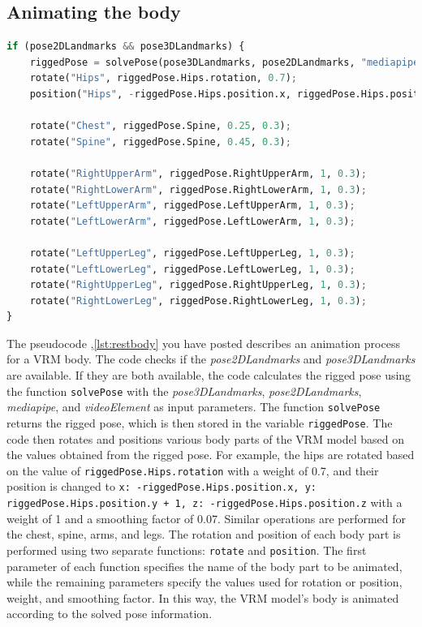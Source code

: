 \subsection{Animating the body}
\begin{lstlisting}[language=Python,caption=Animating the rest of the body,label=lst:restbody]
    if (pose2DLandmarks && pose3DLandmarks) {
    riggedPose = solvePose(pose3DLandmarks, pose2DLandmarks, "mediapipe", videoElement);
    rotate("Hips", riggedPose.Hips.rotation, 0.7);
    position("Hips", -riggedPose.Hips.position.x, riggedPose.Hips.position.y + 1, -riggedPose.Hips.position.z, 1, 0.07);

    rotate("Chest", riggedPose.Spine, 0.25, 0.3);
    rotate("Spine", riggedPose.Spine, 0.45, 0.3);

    rotate("RightUpperArm", riggedPose.RightUpperArm, 1, 0.3);
    rotate("RightLowerArm", riggedPose.RightLowerArm, 1, 0.3);
    rotate("LeftUpperArm", riggedPose.LeftUpperArm, 1, 0.3);
    rotate("LeftLowerArm", riggedPose.LeftLowerArm, 1, 0.3);

    rotate("LeftUpperLeg", riggedPose.LeftUpperLeg, 1, 0.3);
    rotate("LeftLowerLeg", riggedPose.LeftLowerLeg, 1, 0.3);
    rotate("RightUpperLeg", riggedPose.RightUpperLeg, 1, 0.3);
    rotate("RightLowerLeg", riggedPose.RightLowerLeg, 1, 0.3);
}

\end{lstlisting}
The pseudocode ,\ref{lst:restbody} you have posted describes an animation process for a VRM body. 
The code checks if the \emph{pose2DLandmarks} and \emph{pose3DLandmarks} are available. If they are both available, 
the code calculates the rigged pose using the function \texttt{solvePose} with the \emph{pose3DLandmarks}, \emph{pose2DLandmarks}, 
\emph{mediapipe}, and \emph{videoElement} as input parameters. The function \texttt{solvePose} returns the rigged pose, which 
is then stored in the variable \texttt{riggedPose}.
The code then rotates and positions various body parts of the VRM model based on the values obtained from the 
rigged pose. For example, the hips are rotated based on the value of \texttt{riggedPose.Hips.rotation} with a weight 
of 0.7, and their position is changed to \texttt{x: -riggedPose.Hips.position.x, y: riggedPose.Hips.position.y + 1, z: 
-riggedPose.Hips.position.z} with a weight of 1 and a smoothing factor of 0.07. Similar operations are performed 
for the chest, spine, arms, and legs.
The rotation and position of each body part is performed using two separate functions: \texttt{rotate} and 
\texttt{position}. The first parameter of each function specifies the name of the body part to be animated, 
while the remaining parameters specify the values used for rotation or position, weight, and smoothing factor.
In this way, the VRM model's body is animated according to the solved pose information.
\\
\\
